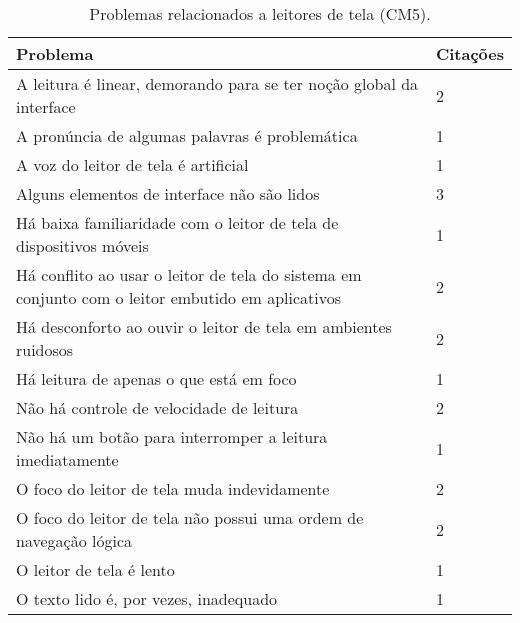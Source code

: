 \begin{table}[htb]
  \begin{center}
    \ABNTEXfontereduzida
    \caption{Problemas relacionados a leitores de tela (CM5).}
    \label{tab-pro-lei-tel-1}
    \begin{tabular}{p{13.1cm}|p{1.4cm}}
      \textbf{Problema}                                                                                & \textbf{Citações} \\
      \hline
      A leitura é linear, demorando para se ter noção global da interface                              & 2                 \\
      \hline
      A pronúncia de algumas palavras é problemática                                                   & 1                 \\
      \hline
      A voz do leitor de tela é artificial                                                             & 1                 \\
      \hline
      Alguns elementos de interface não são lidos                                                      & 3                 \\
      \hline
      Há baixa familiaridade com o leitor de tela de dispositivos móveis                               & 1                 \\
      \hline
      Há conflito ao usar o leitor de tela do sistema em conjunto com o leitor embutido em aplicativos & 2                 \\
      \hline
      Há desconforto ao ouvir o leitor de tela em ambientes ruidosos                                   & 2                 \\
      \hline
      Há leitura de apenas o que está em foco                                                          & 1                 \\
      \hline
      Não há controle de velocidade de leitura                                                         & 2                 \\
      \hline
      Não há um botão para interromper a leitura imediatamente                                         & 1                 \\
      \hline
      O foco do leitor de tela muda indevidamente                                                      & 2                 \\
      \hline
      O foco do leitor de tela não possui uma ordem de navegação lógica                                & 2                 \\
      \hline
      O leitor de tela é lento                                                                         & 1                 \\
      \hline
      O texto lido é, por vezes, inadequado                                                            & 1                 \\
    \end{tabular}
  \end{center}
\end{table}

